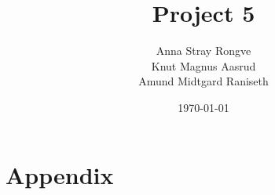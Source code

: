 \documentclass{article}
\title{Project 5}
\author{Anna Stray Rongve \\ Knut Magnus Aasrud \\ Amund Midtgard Raniseth}
\date{\today}
\begin{document}
\maketitle













\section{Appendix}
\end{document}
